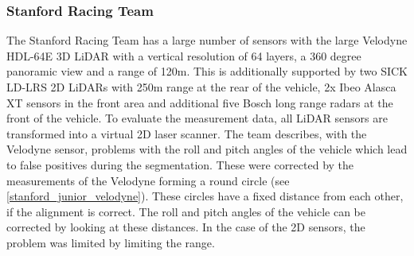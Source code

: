 \documentclass[11pt,oneside,openright]{mpreport}
\begin{document}
\subsubsection{Stanford Racing Team}


The Stanford Racing Team \cite{Montemerlo2009} has a large number of sensors with the large Velodyne HDL-64E 3D LiDAR with a vertical resolution of 64 layers, 
a 360 degree panoramic view and a range of 120m. This is additionally supported by two SICK LD-LRS 2D LiDARs with 250m range at the rear of the vehicle, 2x Ibeo Alasca XT 
sensors in the front area and additional five Bosch long range radars at the front of the vehicle. To evaluate the measurement data, all LiDAR sensors are transformed 
into a virtual 2D laser scanner. The team describes, with the Velodyne sensor, problems with the roll and pitch angles of the vehicle which lead to false positives during the
segmentation. These were corrected by the measurements of the Velodyne forming a round circle (see \cref{stanford_junior_velodyne}). These circles have a fixed distance
from each other, if the alignment is correct. The roll and pitch angles of the vehicle can be corrected by looking at these distances. In the case of the 2D sensors, 
the problem was limited by limiting the range.
\end{document}
